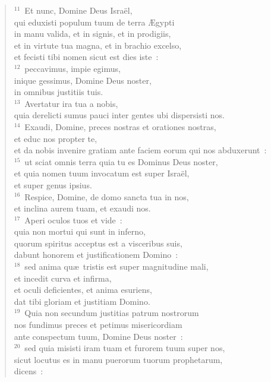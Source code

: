 \begin{verse}${}^{11}$~Et nunc, Domine Deus Isra\"el,\\ qui eduxisti populum tuum de terra \AE gypti\\ in manu valida, et in signis, et in prodigiis,\\ et in virtute tua magna, et in brachio excelso,\\ et fecisti tibi nomen sicut est dies iste~:\\
${}^{12}$~peccavimus, impie egimus,\\ inique gessimus, Domine Deus noster,\\ in omnibus justitiis tuis.\\
${}^{13}$~Avertatur ira tua a nobis,\\ quia derelicti sumus pauci inter gentes ubi dispersisti nos.\\
${}^{14}$~Exaudi, Domine, preces nostras et orationes nostras,\\ et educ nos propter te,\\ et da nobis invenire gratiam ante faciem eorum qui nos abduxerunt~:\\
${}^{15}$~ut sciat omnis terra quia tu es Dominus Deus noster,\\ et quia nomen tuum invocatum est super Isra\"el,\\ et super genus ipsius.\\
${}^{16}$~Respice, Domine, de domo sancta tua in nos,\\ et inclina aurem tuam, et exaudi nos.\\
${}^{17}$~Aperi oculos tuos et vide~:\\ quia non mortui qui sunt in inferno,\\ quorum spiritus acceptus est a visceribus suis,\\ dabunt honorem et justificationem Domino~:\\
${}^{18}$~sed anima qu\ae\ tristis est super magnitudine mali,\\ et incedit curva et infirma,\\ et oculi deficientes, et anima esuriens,\\ dat tibi gloriam et justitiam Domino.\\
${}^{19}$~Quia non secundum justitias patrum nostrorum\\ nos fundimus preces et petimus misericordiam\\ ante conspectum tuum, Domine Deus noster~:\\
${}^{20}$~sed quia misisti iram tuam et furorem tuum super nos,\\ sicut locutus es in manu puerorum tuorum prophetarum,\\ dicens~:

\end{verse}
